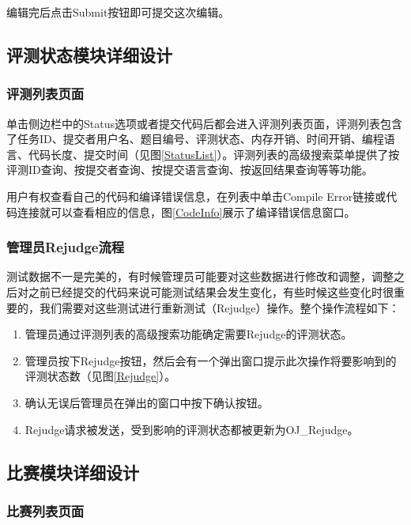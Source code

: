 
编辑完后点击Submit按钮即可提交这次编辑。

\subsection{评测状态模块详细设计}
\subsubsection{评测列表页面}
单击侧边栏中的Status选项或者提交代码后都会进入评测列表页面，评测列表包含了任务ID、提交者用户名、题目编号、评测状态、内存开销、时间开销、编程语言、代码长度、提交时间（见图\ref{StatusList}）。评测列表的高级搜索菜单提供了按评测ID查询、按提交者查询、按提交语言查询、按返回结果查询等等功能。

用户有权查看自己的代码和编译错误信息，在列表中单击Compile Error链接或代码连接就可以查看相应的信息，图\ref{CodeInfo}展示了编译错误信息窗口。


\subsubsection{管理员Rejudge流程}
测试数据不一是完美的，有时候管理员可能要对这些数据进行修改和调整，调整之后对之前已经提交的代码来说可能测试结果会发生变化，有些时候这些变化时很重要的，我们需要对这些测试进行重新测试（Rejudge）操作。整个操作流程如下：
\begin{enumerate}
	\item 管理员通过评测列表的高级搜索功能确定需要Rejudge的评测状态。
	\item 管理员按下Rejudge按钮，然后会有一个弹出窗口提示此次操作将要影响到的评测状态数（见图\ref{Rejudge}）。
	\item 确认无误后管理员在弹出的窗口中按下确认按钮。
	\item Rejudge请求被发送，受到影响的评测状态都被更新为OJ\_Rejudge。
\end{enumerate}


\subsection{比赛模块详细设计}
\subsubsection{比赛列表页面}

